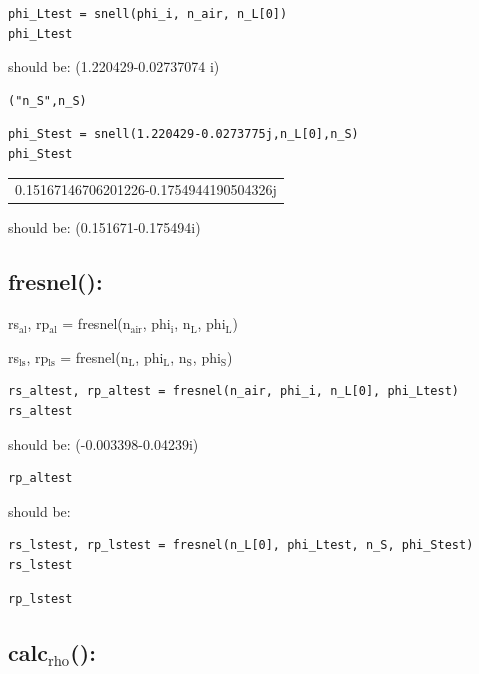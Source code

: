 \documentclass[11pt]{article}
\begin{document}
\begin{verbatim}
phi_Ltest = snell(phi_i, n_air, n_L[0])
phi_Ltest
\end{verbatim}
should be: (1.220429-0.02737074 i)

\begin{verbatim}
("n_S",n_S)
\end{verbatim}

\begin{verbatim}
phi_Stest = snell(1.220429-0.0273775j,n_L[0],n_S)
phi_Stest
\end{verbatim}

\begin{center}
\begin{tabular}{l}
0.15167146706201226-0.1754944190504326j\\
\end{tabular}
\end{center}
should be: (0.151671-0.175494i)



\subsection{fresnel():}
\label{sec:orgb3471e2}

rs\(_{\text{al}}\), rp\(_{\text{al}}\) = fresnel(n\(_{\text{air}}\), phi\(_{\text{i}}\), n\(_{\text{L}}\), phi\(_{\text{L}}\))

rs\(_{\text{ls}}\), rp\(_{\text{ls}}\) = fresnel(n\(_{\text{L}}\), phi\(_{\text{L}}\), n\(_{\text{S}}\), phi\(_{\text{S}}\))

\begin{verbatim}
rs_altest, rp_altest = fresnel(n_air, phi_i, n_L[0], phi_Ltest)
rs_altest
\end{verbatim}
should be: (-0.003398-0.04239i)
\begin{verbatim}
rp_altest
\end{verbatim}
should be: 

\begin{verbatim}
rs_lstest, rp_lstest = fresnel(n_L[0], phi_Ltest, n_S, phi_Stest)
rs_lstest
\end{verbatim}

\begin{verbatim}
rp_lstest
\end{verbatim}

\subsection{calc\(_{\text{rho}}\)():}
\label{sec:orge4ecc23}
\end{document}
